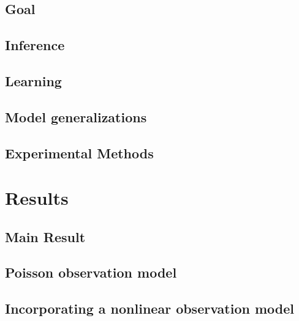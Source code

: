 \subsection{Goal} \label{sec:goal}


\subsection{Inference} \label{sec:inf}


\clearpage\newpage
\subsection{Learning} \label{sec:learn}


\subsection{Model generalizations} \label{sec:model2}


%

\subsection{Experimental Methods} \label{sec:exp}


\newpage
\section{Results} \label{sec:results}
\subsection{Main Result} \label{sec:main}


\clearpage\newpage
\subsection{Poisson observation model} \label{sec:poisson}


\clearpage\newpage
\subsection{Incorporating a nonlinear observation model} \label{sec:nonlin}


